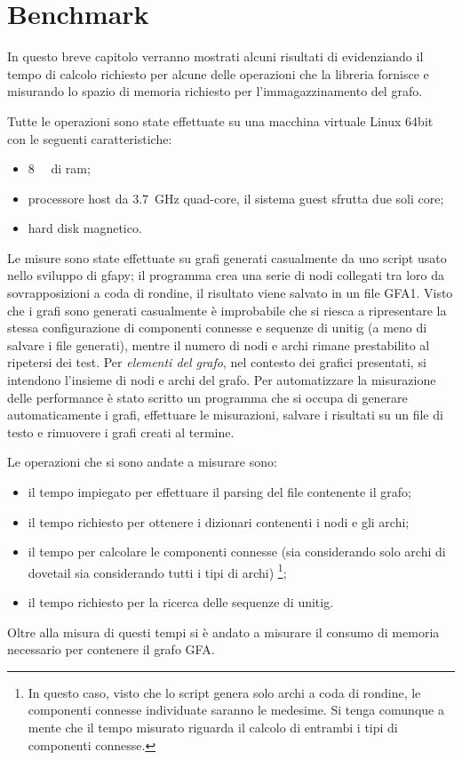 \chapter{Benchmark}
In questo breve capitolo verranno mostrati
alcuni risultati di \pygfa evidenziando il tempo di calcolo
richiesto per alcune delle operazioni che la libreria fornisce e misurando
lo spazio di memoria richiesto per l'immagazzinamento del grafo.

Tutte le operazioni sono state effettuate su una macchina virtuale
Linux 64bit con le seguenti caratteristiche:
\begin{itemize}
	\item \SI{8}{\giga\byte} di ram;
	\item processore host da \SI{3.7}{\giga\hertz} quad-core, il
		sistema guest sfrutta due soli core;
	\item hard disk magnetico.
\end{itemize}

Le misure sono state effettuate su grafi generati casualmente
da uno script usato nello sviluppo di gfapy; il programma
crea una serie di nodi collegati tra loro da sovrapposizioni
a coda di rondine, il risultato viene salvato in un file GFA1.
Visto che i grafi sono generati casualmente è improbabile
che si riesca a ripresentare la stessa configurazione di componenti
connesse e sequenze di unitig (a meno di salvare i file generati),
mentre il numero di nodi e archi rimane prestabilito al ripetersi
dei test. Per \emph{elementi del grafo}, nel contesto dei grafici presentati,
si intendono l'insieme di nodi e archi del grafo.
Per automatizzare la misurazione delle performance è stato
scritto un programma che si occupa di generare automaticamente
i grafi, effettuare le misurazioni, salvare i risultati su un file di testo
e rimuovere i grafi creati al termine.

Le operazioni che si sono andate a misurare sono:
\begin{itemize}
	\item il tempo impiegato per effettuare il parsing del file contenente il grafo;
	\item il tempo richiesto per ottenere i dizionari contenenti i nodi e gli archi;
	\item il tempo per calcolare le componenti connesse (sia considerando
		solo archi di dovetail sia considerando tutti i tipi di archi)
		\footnote{In questo caso, visto che lo script genera solo archi a coda
		di rondine, le componenti connesse individuate saranno le medesime. Si tenga
		comunque a mente che il tempo misurato riguarda il calcolo di entrambi
		i tipi di componenti connesse.};
	\item il tempo richiesto per la ricerca delle sequenze di unitig.
\end{itemize}
Oltre alla misura di questi tempi si è andato a misurare il consumo
di memoria necessario per contenere il grafo GFA.
\clearpage

